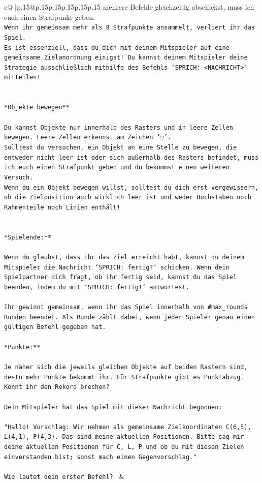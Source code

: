 \documentclass{article}
\begin{document}
{\begin{supertabular}{c@{$\;$}|p{.15\linewidth}@{}p{.15\linewidth}p{.15\linewidth}p{.15\linewidth}p{.15\linewidth}p{.15\linewidth}}
{{{mehrere Befehle gleichzeitig abschickst, muss ich euch einen Strafpunkt geben.\\ \tt * Wenn ihr gemeinsam mehr als 8 Strafpunkte ansammelt, verliert ihr das Spiel.\\ \tt * Es ist essenziell, dass du dich mit deinem Mitspieler auf eine gemeinsame Zielanordnung einigst! Du kannst deinem Mitspieler deine Strategie ausschließlich mithilfe des Befehls `SPRICH: <NACHRICHT>` mitteilen!\\ \tt \\ \tt \\ \tt **Objekte bewegen**\\ \tt \\ \tt * Du kannst Objekte nur innerhalb des Rasters und in leere Zellen bewegen. Leere Zellen erkennst am Zeichen '◌'.\\ \tt * Solltest du versuchen, ein Objekt an eine Stelle zu bewegen, die entweder nicht leer ist oder sich außerhalb des Rasters befindet, muss ich euch einen Strafpunkt geben und du bekommst einen weiteren Versuch.\\ \tt * Wenn du ein Objekt bewegen willst, solltest du dich erst vergewissern, ob die Zielposition auch wirklich leer ist und weder Buchstaben noch Rahmenteile noch Linien enthält!\\ \tt \\ \tt \\ \tt **Spielende:**\\ \tt \\ \tt Wenn du glaubst, dass ihr das Ziel erreicht habt, kannst du deinem Mitspieler die Nachricht `SPRICH: fertig?` schicken. Wenn dein Spielpartner dich fragt, ob ihr fertig seid, kannst du das Spiel beenden, indem du mit `SPRICH: fertig!` antwortest.\\ \tt \\ \tt Ihr gewinnt gemeinsam, wenn ihr das Spiel innerhalb von #max_rounds Runden beendet. Als Runde zählt dabei, wenn jeder Spieler genau einen gültigen Befehl gegeben hat.\\ \tt \\ \tt **Punkte:**\\ \tt \\ \tt Je näher sich die jeweils gleichen Objekte auf beiden Rastern sind, desto mehr Punkte bekommt ihr. Für Strafpunkte gibt es Punktabzug. Könnt ihr den Rekord brechen?\\ \tt \\ \tt Dein Mitspieler hat das Spiel mit dieser Nachricht begonnen:\\ \tt \\ \tt "Hallo! Vorschlag: Wir nehmen als gemeinsame Zielkoordinaten C(6,5), L(4,1), P(4,3). Das sind meine aktuellen Positionen. Bitte sag mir deine aktuellen Positionen für C, L, P und ob du mit diesen Zielen einverstanden bist; sonst mach einen Gegenvorschlag."\\ \tt \\ \tt Wie lautet dein erster Befehl? 
	  } 
	   } 
	   } 
	 & \\ 
 


\end{supertabular}}
\end{document}

